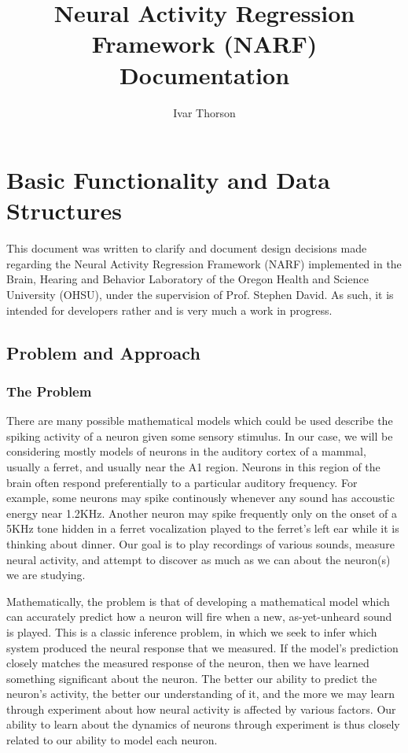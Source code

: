 \documentclass[letterpaper]{report}
\title{Neural Activity Regression Framework (NARF) Documentation}
\author{Ivar Thorson}
\begin{document}
\maketitle
\tableofcontents

\chapter{Basic Functionality and Data Structures}

This document was written to clarify and document design decisions made regarding the Neural Activity Regression Framework (NARF) implemented in the Brain, Hearing and Behavior Laboratory of the Oregon Health and Science University (OHSU), under the supervision of Prof. Stephen David. As such, it is intended for developers rather and is very much a work in progress. 

\section{Problem and Approach}

\subsection{The Problem}

There are many possible mathematical models which could be used describe the spiking activity of a neuron given some sensory stimulus. In our case, we will be considering mostly models of neurons in the auditory cortex of a mammal, usually a ferret, and usually near the A1 region. Neurons in this region of the brain often respond preferentially to a particular auditory frequency. For example, some neurons may spike continously whenever any sound has accoustic energy near 1.2KHz. Another neuron may spike frequently only on the onset of a 5KHz tone hidden in a ferret vocalization played to the  ferret's left ear while it is thinking about dinner. Our goal is to play recordings of various sounds, measure neural activity, and attempt to discover as much as we can about the neuron(s) we are studying.

Mathematically, the problem is that of developing a mathematical model which can accurately predict how a neuron will fire when a new, as-yet-unheard sound is played. This is a classic inference problem, in which we seek to infer which system produced the neural response that we measured. If the model's prediction closely matches the measured response of the neuron, then we have learned something significant about the neuron. The better our ability to predict the neuron's activity, the better our understanding of it, and the more we may learn through experiment about how neural activity is affected by various factors. Our ability to learn about the dynamics of neurons through experiment is thus closely related to our ability to model each neuron.
\end{document}
